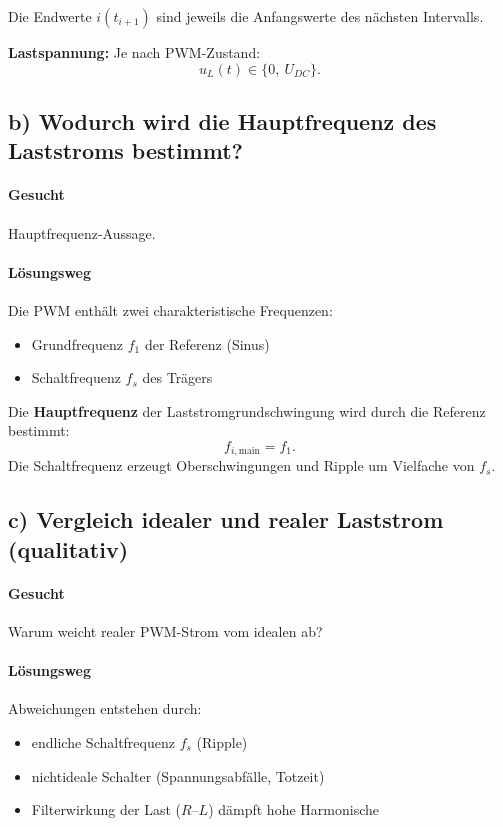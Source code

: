 Die Endwerte $i(t_{i+1})$ sind jeweils die Anfangswerte des nächsten Intervalls.

\textbf{Lastspannung:}
Je nach PWM-Zustand:
\[
\boxed{u_L(t)\in\{0,\ U_{DC}\}}.
\]


\subsection*{b) Wodurch wird die Hauptfrequenz des Laststroms bestimmt?}

\paragraph{Gesucht}
Hauptfrequenz-Aussage.

\paragraph{Lösungsweg}
Die PWM enthält zwei charakteristische Frequenzen:
\begin{itemize}
\item Grundfrequenz $f_1$ der Referenz (Sinus)
\item Schaltfrequenz $f_s$ des Trägers
\end{itemize}
Die \textbf{Hauptfrequenz} der Laststromgrundschwingung wird durch die Referenz bestimmt:
\[
\boxed{f_{i,\mathrm{main}}=f_1.}
\]
Die Schaltfrequenz erzeugt Oberschwingungen und Ripple um Vielfache von $f_s$.


\subsection*{c) Vergleich idealer und realer Laststrom (qualitativ)}

\paragraph{Gesucht}
Warum weicht realer PWM-Strom vom idealen ab?

\paragraph{Lösungsweg}
Abweichungen entstehen durch:
\begin{itemize}
\item endliche Schaltfrequenz $f_s$ (Ripple)
\item nichtideale Schalter (Spannungsabfälle, Totzeit)
\item Filterwirkung der Last ($R$--$L$) dämpft hohe Harmonische
\end{itemize}



